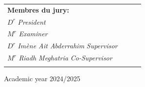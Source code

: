 \begin{titlepage}
\begin{center}
\begin{tabular}{llll}
\\
\textbf{Membres du jury: \hspace{0cm}}~~~~~~~~~~~~\\
\vspace{0.1cm}
\hspace{0cm} $D^{r}$ \textsl{} \hspace{2.2cm} \textsl{ \emph{President}}\\
\vspace{0.1cm}
\hspace{0cm} $M^{r}$ \textsl{}  \hspace{1.69cm} \textsl{ \emph{Examiner}}\\
\vspace{0.1cm}
\hspace{0cm} $D^{r}$ \textsl{Imène Ait Abderrahim} \hspace{2.2cm} \textsl{ \emph{Supervisor}}\\
\vspace{0.1cm}
\hspace{0cm} $M^{r}$ \textsl{Riadh Meghatria} \hspace{3.2cm} \textsl{ \emph{Co-Supervisor}}\\

\vspace{0.12cm}
\vspace{0.1cm}
\end{tabular}
\end{center}
\vspace{0.12cm}
\begin{center}
Academic year 2024/2025
\end{center}
\end{titlepage}